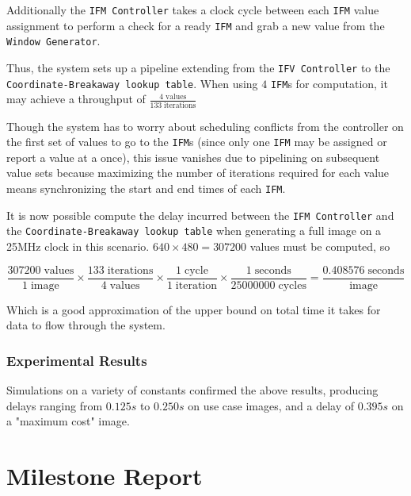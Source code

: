 \documentclass{article}
\begin{document}
Additionally the \texttt{IFM Controller} takes a clock cycle between each \texttt{IFM} value assignment to perform a check for a ready \texttt{IFM} and grab a new value from the \texttt{Window Generator}. 

Thus, the system sets up a pipeline extending from the \texttt{IFV Controller} to the \texttt{Coordinate-Breakaway lookup table}. When using $4$ \texttt{IFM}s for computation, it may achieve a throughput of $\frac{4\; \text{values}}{133\; \text{iterations}}$ 

Though the system has to worry about
scheduling conflicts from the controller on the first set of values to go to the \texttt{IFM}s (since only one \texttt{IFM} may be assigned or report a value at a once), this issue vanishes due to pipelining on subsequent value sets because maximizing the number of iterations required for each value means synchronizing the start and end times of each \texttt{IFM}.

It is now possible compute the delay incurred between the \texttt{IFM Controller} and the \texttt{Coordinate-Breakaway lookup table} when generating a full image on a 25MHz clock in this scenario. $640 \times 480 = 307200$ values must be computed, so

$$
\frac{307200\; \text{values}}{1\; \text{image}} \times \frac{133 \;\text{iterations}}{4 \;\text{values}} \times \frac{1 \;\text{cycle}}{1 \;\text{iteration}} \times \frac{1 \;\text{seconds}}{25000000 \;\text{cycles}} = \frac{0.408576 \;\text{seconds}}{\text{image}}
$$

Which is a good approximation of the upper bound on total time it takes for data to flow through the system.

\subsubsection{Experimental Results}

Simulations on a variety of constants confirmed the above results, producing delays ranging from $0.125s$ to $0.250s$ 
on use case images, and a delay of $0.395s$ on a "maximum cost" image. 

\section{Milestone Report}
\end{document}
